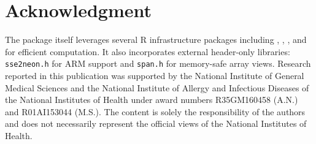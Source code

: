 \section{Acknowledgment}
The  package itself leverages several R infrastructure packages including  \citep{rcpppkg},  \citep{eigenpkg}, \citep{parallelpkg}, and  \citep{mgcvcite} for efficient computation. It also incorporates external header-only libraries: \texttt{sse2neon.h} \citep{sse2neon2020} for ARM support and \texttt{span.h} \citep{span2020} for memory-safe array views.
Research reported in this publication was supported by the National Institute of General Medical Sciences and the National Institute of Allergy and Infectious Diseases of the National Institutes of Health under award numbers  R35GM160458 (A.N.) and R01AI153044 (M.S.). The content is solely the responsibility of the authors and does not necessarily represent the official views of the National Institutes of Health.



\address{Zhenyu Zhang\\
  Department of Biostatistics, Fielding School of Public Health,\\
  University of California, Los Angeles, \\
  650 Charles E. Young Dr. South, Los Angeles, CA\\
  USA\\
  ORCiD: 0000-0002-2176-2253\\
  }

\address{Andrew Chin\\
  Department of Biostatistics, Bloomberg School of Public Health,\\
  Johns Hopkins University,\\
 615 North Wolfe Street, Baltimore, MD 21205\\
 USA\\
 ORCiD: 0009-0005-3832-841X\\
  }

\address{Akihiko Nishimura \\
  Department of Biostatistics, Bloomberg School of Public Health,\\
  Johns Hopkins University,\\
  615 North Wolfe Street, Baltimore, MD 21205\\
  USA\\
  ORCiD: 0000-0002-6932-2513\\
  }

